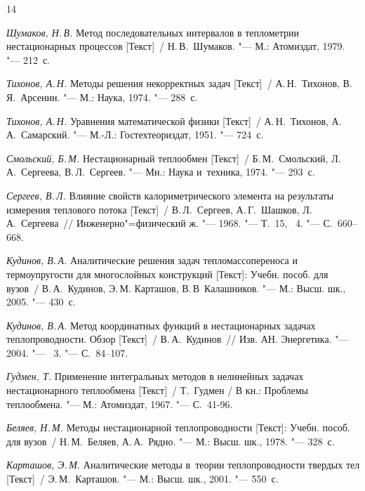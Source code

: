 \begin{thebibliography}{14}
\item \textit{Шумаков, Н.\,В.} 
	Метод последовательных интервалов в теплометрии нестационарных процессов [Текст]~/
	Н.\,В.~Шумаков. "--- М.: Атомиздат, 1979. "--- 212~с.

\item \textit{Тихонов, А.\,Н.}
	Методы решения некорректных задач [Текст]~/
	А.\,Н.~Тихонов, В.\,Я.~Арсенин. "--- М.: Наука, 1974. "--- 288~с.

\item \textit{Тихонов, А.\,Н.}
	Уравнения математической физики [Текст]~/
	А.\,Н.~Тихонов, А.\,А.~Самарский. "--- М.-Л.: Гостехтеориздат, 1951. "--- 724~с.

\item {\it Смольский, Б.\,М.} Нестационарный теплообмен [Текст]~/
	Б.\,М.~Смольский, Л.\,А.~Сергеева,  В.\,Л.~Сергеев. "--- Мн.: Наука и~техника, 1974. "--- 293~с.

\item {\it Сергеев, В.\,Л.}
	 Влияние свойств калориметрического элемента на результаты измерения теплового потока [Текст]~/
	В.\,Л.~Сергеев, А.\,Г.~Шашков, Л.\,А.~Сергеева~/\!/ Инженерно"=физический ж. "--- 1968.
	"--- Т.~15, \No~4. "--- С.~660--668.

\item {\it Кудинов, В.\,А.}
	Аналитические решения задач тепломассопереноса и термоупругости для многослойных конструкций [Текст]: Учебн. пособ. для вузов~/
	В.\,А.~Кудинов, Э.\,М. Карташов, В.\,В~Калашников. "--- М.: Высш. шк., 2005. "--- 430~с. 

\item {\it Кудинов, В.\,А.}
	Метод координатных функций в нестационарных задачах теплопроводности. Обзор [Текст]~/
 	В.\,А.~Кудинов~/\!/ Изв. АН. Энергетика. "--- 2004.  "--- \No~3. "--- С.~84--107. 

\item {\it Гудмен, Т. }
	Применение интегральных методов в нелинейных задачах нестационарного теплообмена [Текст]~/
	Т.~Гудмен  / В кн.: Проблемы теплообмена. "--- М.: Атомиздат, 1967. "--- С.~41-96.

\item {\it Беляев, Н.\,М.}
	Методы нестационарной теплопроводности [Текст]: Учебн. пособ. для вузов~/
	Н.\,М.~Беляев, А.\,А.~Рядно. "--- М.: Высш. шк., 1978. "--- 328~с.

\item {\it Карташов, Э.\,М. }
	Аналитические методы в~теории теплопроводности твердых тел [Текст]~/ 
	Э.\,М.~Карташов. "--- М.: Высш. шк., 2001. "--- 550~с.


\end{thebibliography}
